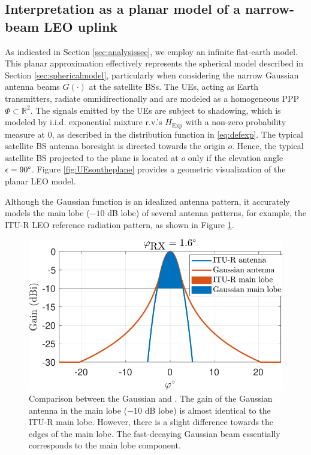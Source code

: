 \documentclass[lettersize,journal]{IEEEtran}
\begin{document}
\subsection{Interpretation as a planar model of a narrow-beam LEO uplink}
\label{sec:planarmodel}


As indicated in Section \ref{sec:analysissec}, we employ an infinite flat-earth model.  This planar approximation effectively represents the spherical model described in Section \ref{sec:sphericalmodel}, particularly when considering the narrow Gaussian antenna beams $G(\cdot)$ at the satellite BSs. The UEs, acting as Earth transmitters, radiate omnidirectionally and are modeled as a homogeneous PPP $\Phi \subset \mathbb{R}^2$. The signals emitted by the UEs are subject to shadowing, which is modeled by i.i.d. exponential mixture r.v.'s $H_{\text{Exp}}$ with a non-zero probability measure at $0$, as described in the distribution function in \eqref{eq:defexp}. The typical satellite BS antenna boresight is directed towards the origin $\textit{o}$. Hence, the typical satellite BS projected to the plane is located at $\textit{o}$ only if the elevation angle $\epsilon=90 \degree$. Figure \ref{fig:UEsontheplane} provides a geometric visualization of the planar LEO model.



Although the Gaussian function is an idealized antenna pattern, it accurately models the main lobe ($-10$ dB lobe) of several antenna patterns, for example, the ITU-R LEO reference radiation pattern, as shown in Figure \ref{fig:antennapats}.

\begin{figure}[h]
  \centering
  \includegraphics[width=\linewidth]{antennapats.pdf}
  \caption{Comparison between the Gaussian and \cite[ITU-R LEO reference radiation patterns]{ITURS1528}. The gain of the Gaussian antenna in the main lobe ($-10$ dB lobe) is almost identical to the ITU-R main lobe. However, there is a slight difference towards the edges of the main lobe. 
    The fast-decaying Gaussian beam essentially corresponds to the main lobe component.} 
  \label{fig:antennapats}
\end{figure}
\end{document}
